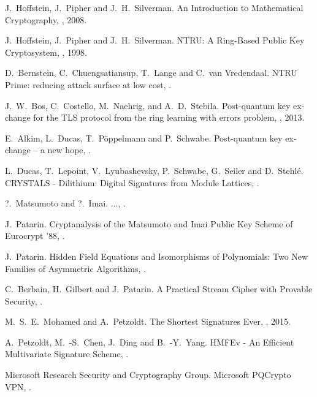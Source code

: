 \documentclass[a4paper,11pt]{article}
\begin{document}
\begin{otherlanguage}{english}
\begin{multicols}{2}
\begin{thebibliography}{1}
J.~Hoffstein, J.~Pipher and J.~H.~Silverman.
\newblock An Introduction to Mathematical Cryptography,
, 2008.

J.~Hoffstein, J.~Pipher and J.~H.~Silverman.
\newblock NTRU: A Ring-Based Public Key Cryptosystem,
, 1998.

D.~Bernstein, C.~Chuengsatiansup, T.~Lange and C.~van Vredendaal.
\newblock NTRU Prime: reducing attack surface at low cost,
.

J.~W.~Bos, C.~Costello, M.~Naehrig, and A.~D.~Stebila.
\newblock Post-quantum key exchange for the TLS protocol from the ring
learning with errors problem,
, 2013.

E.~Alkim, L.~Ducas, T.~Pöppelmann and P.~Schwabe.
\newblock Post-quantum key exchange – a new hope,
.

L.~Ducas, T.~Lepoint, V.~Lyubashevsky, P.~Schwabe, G.~Seiler and D.~Stehlé.
\newblock CRYSTALS - Dilithium: Digital Signatures from Module Lattices,
.

?.~Matsumoto and ?.~Imai.
\newblock ...,
.

J.~Patarin.
\newblock Cryptanalysis of the Matsumoto and Imai Public Key Scheme of Eurocrypt '88,
.

J.~Patarin.
\newblock Hidden Field Equations and Isomorphisms of Polynomials: Two New Families of Asymmetric Algorithms,
.

C.~Berbain, H.~Gilbert and J.~Patarin.
\newblock A Practical Stream Cipher with Provable Security,
.

M.~S.~E.~Mohamed and A.~Petzoldt.
\newblock The Shortest Signatures Ever,
, 2015.

A.~Petzoldt, M.~-S.~Chen, J.~Ding and B.~-Y.~Yang.
\newblock HMFEv - An Efficient Multivariate Signature Scheme,
.

Microsoft Research Security and Cryptography Group.
\newblock Microsoft PQCrypto VPN,
.
  
\end{thebibliography}


\end{multicols}



\end{otherlanguage}
\end{document}
